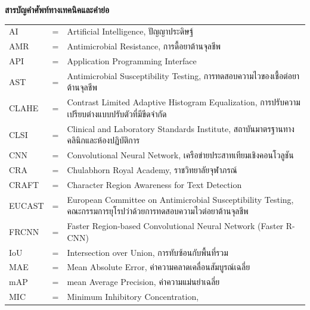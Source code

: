 \clearpage
{}
{}

\begin{center}\textbf{สารบัญคำศัพท์ทางเทคนิคและคำย่อ}\end{center}

\vspace{0.3cm}

\begin{tabular}{@{}lcp{10.5cm}@{}}
  AI        & = & Artificial Intelligence, ปัญญาประดิษฐ์ \\[0.1cm]
  AMR       & = & Antimicrobial Resistance, การดื้อยาต้านจุลชีพ \\[0.1cm]
  API       & = & Application Programming Interface \\[0.1cm]
  AST       & = & Antimicrobial Susceptibility Testing,
                  การทดสอบความไวของเชื้อต่อยาต้านจุลชีพ \\[0.1cm]
  CLAHE     & = & Contrast Limited Adaptive Histogram Equalization,
                  การปรับความเปรียบต่างแบบปรับตัวที่มีขีดจำกัด \\[0.1cm]
  CLSI      & = & Clinical and Laboratory Standards Institute,
                  สถาบันมาตรฐานทางคลินิกและห้องปฏิบัติการ \\[0.1cm]
  CNN       & = & Convolutional Neural Network,
                  เครือข่ายประสาทเทียมเชิงคอนโวลูชัน \\[0.1cm]
  CRA       & = & Chulabhorn Royal Academy,
                  ราชวิทยาลัยจุฬาภรณ์ \\[0.1cm]
  CRAFT     & = & Character Region Awareness for Text Detection \\[0.1cm]
  EUCAST    & = & European Committee on Antimicrobial Susceptibility Testing,
                  คณะกรรมการยุโรปว่าด้วยการทดสอบความไวต่อยาต้านจุลชีพ \\[0.1cm]
  FRCNN     & = & Faster Region-based Convolutional Neural Network (Faster R-CNN) \\[0.1cm]
  IoU       & = & Intersection over Union, การทับซ้อนกับพื้นที่รวม \\[0.1cm]
  MAE       & = & Mean Absolute Error, ค่าความคลาดเคลื่อนสัมบูรณ์เฉลี่ย \\[0.1cm]
  mAP       & = & mean Average Precision, ค่าความแม่นยำเฉลี่ย \\[0.1cm]
  MIC       & = & Minimum Inhibitory Concentration,

\end{tabular}
